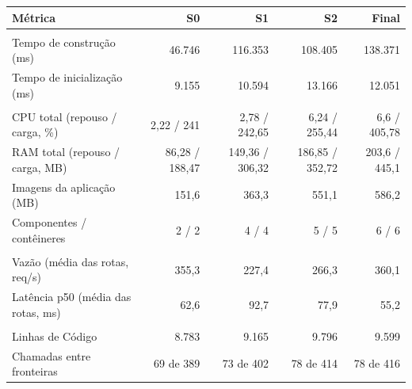 \begin{quadro}[htb]
  \centering
  \caption{Inventário --- métricas por snapshot --- Capacidade de Negócio.}
  \label{qua:comp_inventory-api_capacidade-negocio_snapshots}
  \renewcommand{\arraystretch}{1.15}
  \begin{tabularx}{\textwidth}{|>{\raggedright\arraybackslash}X|r|r|r|r|}
    \hline
    \textbf{Métrica} & \textbf{S0} & \textbf{S1} & \textbf{S2} & \textbf{Final} \\
    \hline
    \multicolumn{5}{|l|}{\textbf{Agilidade}} \\
    \hline
    Tempo de construção (ms) & 46.746 & 116.353 & 108.405 & 138.371 \\
    Tempo de inicialização (ms) & 9.155 & 10.594 & 13.166 & 12.051 \\
    \hline
    \multicolumn{5}{|l|}{\textbf{Custo}} \\
    \hline
    CPU total (repouso / carga, \%) & 2,22 / 241 & 2,78 / 242,65 & 6,24 / 255,44 & 6,6 / 405,78 \\
    RAM total (repouso / carga, MB) & 86,28 / 188,47 & 149,36 / 306,32 & 186,85 / 352,72 & 203,6 / 445,1 \\
    Imagens da aplicação (MB) & 151,6 & 363,3 & 551,1 & 586,2 \\
    Componentes / contêineres & 2 / 2 & 4 / 4 & 5 / 5 & 6 / 6 \\
    \hline
    \multicolumn{5}{|l|}{\textbf{Desempenho}} \\
    \hline
    Vazão (média das rotas, req/s) & 355,3 & 227,4 & 266,3 & 360,1 \\
    Latência p50 (média das rotas, ms) & 62,6 & 92,7 & 77,9 & 55,2 \\
    \hline
    \multicolumn{5}{|l|}{\textbf{Manutenibilidade}} \\
    \hline
    Linhas de Código & 8.783 & 9.165 & 9.796 & 9.599 \\
    Chamadas entre fronteiras & 69 de 389 & 73 de 402 & 78 de 414 & 78 de 416 \\
    \hline
  \end{tabularx}
\end{quadro}
